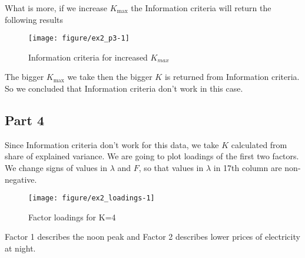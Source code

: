 \documentclass[12pt, a4paper]{article}\usepackage[]{graphicx}\usepackage[]{color}
\makeatletter
\def\maxwidth{ %
  \ifdim\Gin@nat@width>\linewidth
    \linewidth
  \else
    \Gin@nat@width
  \fi
}
\newenvironment{knitrout}{}{} %
\makeatother
\begin{document}
What is more, if we increase $K_\text{max}$ the Information criteria will return the following results
\begin{knitrout}
\color{fgcolor}\begin{figure}[H]

{\centering \texttt{[image: figure/ex2\_p3-1]} 

}

\caption[Information criteria for increased $K_{max}$]{Information criteria for increased $K_{max}$}\label{fig:ex2.p3}
\end{figure}


\end{knitrout}
The bigger $K_\text{max}$ we take then the bigger $K$ is returned from Information criteria. So we concluded that Information criteria don't work in this case.



\subsection{Part 4}
Since Information criteria don't work for this data, we take $K$ calculated from share of explained variance. We are going to plot loadings of the first two factors. We change signs of values in $\lambda$ and $F$, so that values in $\lambda$ in 17th column are non-negative.
\begin{knitrout}
\color{fgcolor}\begin{figure}[H]

{\centering \texttt{[image: figure/ex2\_loadings-1]} 

}

\caption[Factor loadings for K=4]{Factor loadings for K=4}\label{fig:ex2.loadings}
\end{figure}


\end{knitrout}
Factor 1 describes the noon peak and Factor 2 describes lower prices of electricity at night.


\end{document}
